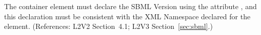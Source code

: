 The  container element must declare the SBML Version
using the attribute , and this declaration must be
consistent with the XML Namespace declared for the 
element.  (References: L2V2 Section~4.1; L2V3 Section~\ref{sec:sbml}.)
